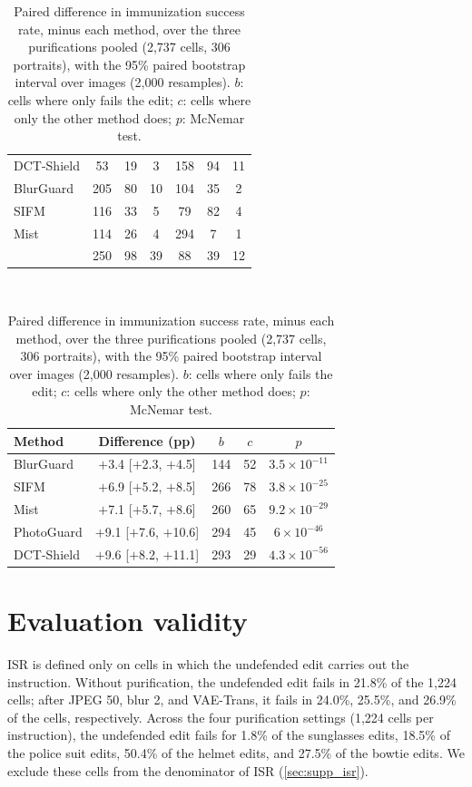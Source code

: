 \begin{table}[t]
\begin{minipage}[t]{0.46\textwidth}
\begin{tabular}{@{}l ccc ccc@{}}
    DCT-Shield & 53 & 19 & 3 & 158 & 94 & 11 \\
    BlurGuard & 205 & 80 & 10 & 104 & 35 & 2 \\
    SIFM & 116 & 33 & 5 & 79 & 82 & 4 \\
    Mist & 114 & 26 & 4 & 294 & 7 & 1 \\
    \midrule
    \rowcolor{oursrow}
    \capg{} & 250 & 98 & 39 & 88 & 39 & 12 \\
    \bottomrule
  \end{tabular}
  \end{minipage}\\[8pt]
  \centering
  \begin{minipage}[t]{0.55\textwidth}
  \centering
  \footnotesize
  \setlength{\tabcolsep}{4pt}
  \caption{Paired difference in immunization success rate, \capg{} minus each method, over the three purifications pooled (2{,}737 cells, 306 portraits), with the 95\% paired bootstrap interval over images (2{,}000 resamples). $b$: cells where only \capg{} fails the edit; $c$: cells where only the other method does; $p$: McNemar test.}
  \label{tab:supp_isr_paired}
  \begin{tabular}{@{}l c cc c@{}}
    \toprule
    Method & Difference (pp) & $b$ & $c$ & $p$ \\
    \midrule
    BlurGuard & $+$3.4 [$+$2.3, $+$4.5] & 144 & 52 & $3.5\times10^{-11}$ \\
    SIFM & $+$6.9 [$+$5.2, $+$8.5] & 266 & 78 & $3.8\times10^{-25}$ \\
    Mist & $+$7.1 [$+$5.7, $+$8.6] & 260 & 65 & $9.2\times10^{-29}$ \\
    PhotoGuard & $+$9.1 [$+$7.6, $+$10.6] & 294 & 45 & $6\times10^{-46}$ \\
    DCT-Shield & $+$9.6 [$+$8.2, $+$11.1] & 293 & 29 & $4.3\times10^{-56}$ \\
    \bottomrule
  \end{tabular}
  \end{minipage}
\end{table}

\section{Evaluation validity}
\label{sec:supp_validity}
ISR is defined only on cells in which the undefended edit carries out the instruction. Without purification, the undefended edit fails in 21.8\% of the 1{,}224 cells; after JPEG 50, blur 2, and VAE-Trans, it fails in 24.0\%, 25.5\%, and 26.9\% of the cells, respectively. Across the four purification settings (1{,}224 cells per instruction), the undefended edit fails for 1.8\% of the sunglasses edits, 18.5\% of the police suit edits, 50.4\% of the helmet edits, and 27.5\% of the bowtie edits. We exclude these cells from the denominator of ISR (\cref{sec:supp_isr}).

